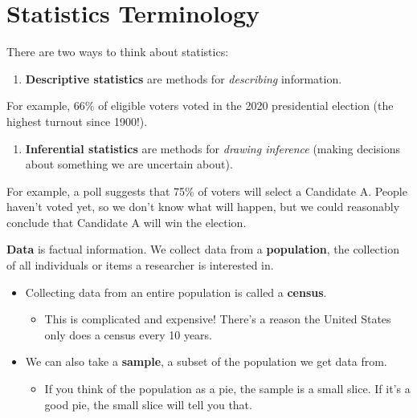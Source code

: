 \documentclass[
]{book}
\providecommand{\tightlist}{%
  \setlength{\itemsep}{0pt}\setlength{\parskip}{0pt}}
\begin{document}
\hypertarget{statistics-terminology}{%
\section{Statistics Terminology}\label{statistics-terminology}}

There are two ways to think about statistics:

\begin{enumerate}
\def\labelenumi{\arabic{enumi}.}
\tightlist
\item
  \textbf{Descriptive statistics} are methods for \emph{describing} information.
\end{enumerate}

For example, 66\% of eligible voters voted in the 2020 presidential election (the highest turnout since 1900!).

\begin{enumerate}
\def\labelenumi{\arabic{enumi}.}
\setcounter{enumi}{1}
\tightlist
\item
  \textbf{Inferential statistics} are methods for \emph{drawing inference} (making decisions about something we are uncertain about).
\end{enumerate}

For example, a poll suggests that 75\% of voters will select a Candidate A. People haven't voted yet, so we don't know what will happen, but we could reasonably conclude that Candidate A will win the election.

\textbf{Data} is factual information. We collect data from a \textbf{population}, the collection of all individuals or items a researcher is interested in.

\begin{itemize}
\tightlist
\item
  Collecting data from an entire population is called a \textbf{census}.

  \begin{itemize}
  \tightlist
  \item
    This is complicated and expensive! There's a reason the United States only does a census every 10 years.
  \end{itemize}
\item
  We can also take a \textbf{sample}, a subset of the population we get data from.

  \begin{itemize}
  \tightlist
  \item
    If you think of the population as a pie, the sample is a small slice. If it's a good pie, the small slice will tell you that.
  \end{itemize}
\end{itemize}
\end{document}
